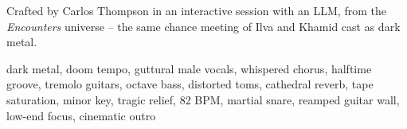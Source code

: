 

\begin{notes}
Crafted by Carlos Thompson in an interactive session with an LLM, from the \emph{Encounters} universe -- the same chance meeting of Ilva and Khamid cast as dark metal.
\end{notes}

\begin{style}
dark metal, doom tempo, guttural male vocals, whispered chorus, halftime groove, tremolo guitars, octave bass, distorted toms, cathedral reverb, tape saturation, minor key, tragic relief, 82 BPM, martial snare, reamped guitar wall, low-end focus, cinematic outro
\end{style}

